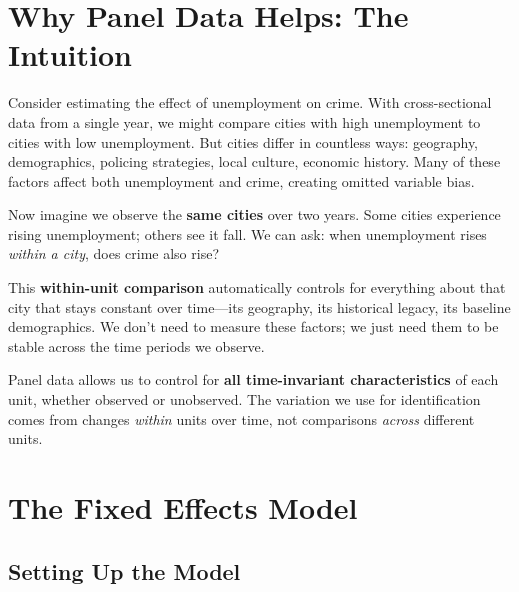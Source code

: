 \documentclass[
  letterpaper,
  DIV=11,
  numbers=noendperiod]{scrreprt}
\begin{document}
\section{Why Panel Data Helps: The
Intuition}\label{why-panel-data-helps-the-intuition}

Consider estimating the effect of unemployment on crime. With
cross-sectional data from a single year, we might compare cities with
high unemployment to cities with low unemployment. But cities differ in
countless ways: geography, demographics, policing strategies, local
culture, economic history. Many of these factors affect both
unemployment and crime, creating omitted variable bias.

Now imagine we observe the \textbf{same cities} over two years. Some
cities experience rising unemployment; others see it fall. We can ask:
when unemployment rises \emph{within a city}, does crime also rise?

This \textbf{within-unit comparison} automatically controls for
everything about that city that stays constant over time---its
geography, its historical legacy, its baseline demographics. We don't
need to measure these factors; we just need them to be stable across the
time periods we observe.

\begin{tcolorbox}[enhanced jigsaw, arc=.35mm, bottomrule=.15mm, bottomtitle=1mm, breakable, colback=white, colbacktitle=quarto-callout-important-color!10!white, colframe=quarto-callout-important-color-frame, coltitle=black, left=2mm, leftrule=.75mm, opacityback=0, opacitybacktitle=0.6, rightrule=.15mm, title=\textcolor{quarto-callout-important-color}{\faExclamation}\hspace{0.5em}{The Key Insight}, titlerule=0mm, toprule=.15mm, toptitle=1mm]

Panel data allows us to control for \textbf{all time-invariant
characteristics} of each unit, whether observed or unobserved. The
variation we use for identification comes from changes \emph{within}
units over time, not comparisons \emph{across} different units.

\end{tcolorbox}

\section{The Fixed Effects Model}\label{the-fixed-effects-model}

\subsection{Setting Up the Model}\label{setting-up-the-model}
\end{document}
